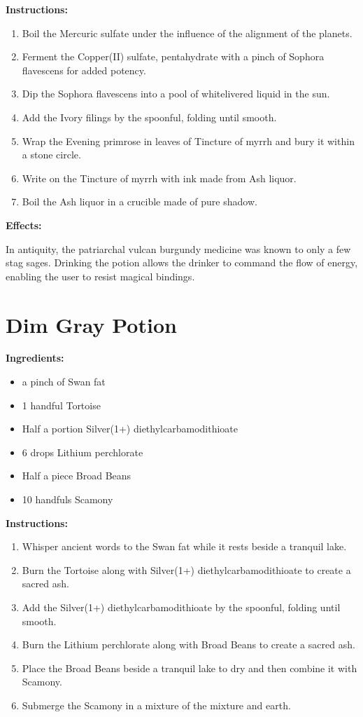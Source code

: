 \documentclass{article}
\begin{document}
\textbf{Instructions:}

\begin{enumerate}
  \item Boil the Mercuric sulfate under the influence of the alignment of the planets.
  \item Ferment the Copper(II) sulfate, pentahydrate with a pinch of Sophora flavescens for added potency.
  \item Dip the Sophora flavescens into a pool of whitelivered liquid in the sun.
  \item Add the Ivory filings by the spoonful, folding until smooth.
  \item Wrap the Evening primrose in leaves of Tincture of myrrh and bury it within a stone circle.
  \item Write on the Tincture of myrrh with ink made from Ash liquor.
  \item Boil the Ash liquor in a crucible made of pure shadow.
\end{enumerate}

\textbf{Effects:}

In antiquity, the patriarchal vulcan burgundy medicine was known to only a few stag sages. Drinking the potion allows the drinker to command the flow of energy, enabling the user to resist magical bindings.

\newpage
\section*{Dim Gray Potion}

\textbf{Ingredients:}

\begin{itemize}
  \item a pinch of Swan fat
  \item 1 handful Tortoise
  \item Half a portion Silver(1+) diethylcarbamodithioate
  \item 6 drops Lithium perchlorate
  \item Half a piece Broad Beans
  \item 10 handfuls Scamony
\end{itemize}

\textbf{Instructions:}

\begin{enumerate}
  \item Whisper ancient words to the Swan fat while it rests beside a tranquil lake.
  \item Burn the Tortoise along with Silver(1+) diethylcarbamodithioate to create a sacred ash.
  \item Add the Silver(1+) diethylcarbamodithioate by the spoonful, folding until smooth.
  \item Burn the Lithium perchlorate along with Broad Beans to create a sacred ash.
  \item Place the Broad Beans beside a tranquil lake to dry and then combine it with Scamony.
  \item Submerge the Scamony in a mixture of the mixture and earth.
\end{enumerate}
\end{document}
